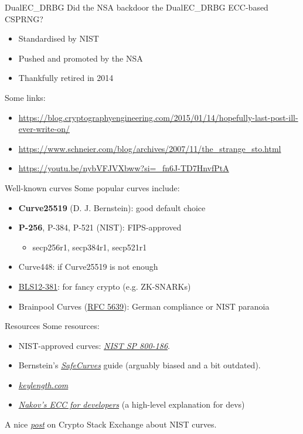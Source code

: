 \begin{frame}{DualEC\_DRBG}
  Did the NSA backdoor the DualEC\_DRBG ECC-based CSPRNG?
  \begin{itemize}[<+(1)->]
    \item Standardised by NIST
    \item Pushed and promoted by the NSA
    \item Thankfully retired in 2014
  \end{itemize}

  \pause
  Some links:
  \begin{itemize}
    \item \url{https://blog.cryptographyengineering.com/2015/01/14/hopefully-last-post-ill-ever-write-on/}
    \item \url{https://www.schneier.com/blog/archives/2007/11/the_strange_sto.html}
    \item \url{https://youtu.be/nybVFJVXbww?si=_fn6J-TD7HnvfPtA}
  \end{itemize}
\end{frame}

\begin{frame}{Well-known curves}
  Some popular curves include:
  \begin{itemize}[<+(1)->]
    \item \textbf{Curve25519} (D. J. Bernstein): good default choice
    \item \textbf{P-256}, P-384, P-521 (NIST): FIPS-approved
    \begin{itemize}
      \item secp256r1, secp384r1, secp521r1 
    \end{itemize}
    \item Curve448: if Curve25519 is not enough
    \item \href{https://hackmd.io/@benjaminion/bls12-381}{BLS12-381}: for fancy crypto (e.g. ZK-SNARKs)
    \item Brainpool Curves (\href{https://datatracker.ietf.org/doc/html/rfc5639}{RFC 5639}): German compliance or NIST paranoia
  \end{itemize}
\end{frame}

\begin{frame}{Resources}
  Some resources:
  \begin{itemize}[<+(1)->]
    \item NIST-approved curves: \href{https://csrc.nist.gov/pubs/sp/800/186/final}{\textit{NIST SP 800-186}}.
    \item Bernstein's \href{https://safecurves.cr.yp.to}{\emph{SafeCurves}} guide (arguably biased and a bit outdated).
    \item \href{https://www.keylength.com/en/}{\textit{keylength.com}}
    \item \href{https://cryptobook.nakov.com/asymmetric-key-ciphers/elliptic-curve-cryptography-ecc}{\textit{Nakov's ECC for developers}} (a high-level explanation for devs)
  \end{itemize}

  \pause
  A nice \href{https://crypto.stackexchange.com/questions/93519/why-are-nist-curves-still-used}{\textit{post}} on Crypto Stack Exchange about NIST curves.
\end{frame}


